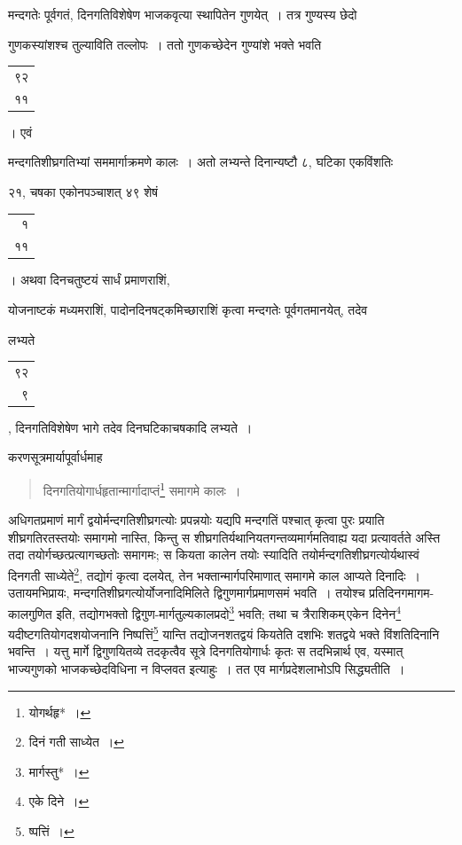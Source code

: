 \documentclass[10pt, openany]{book}
\begin{document}
{{{{{\newpage

{मन्दगतेः पूर्वगतं, दिनगतिविशेषेण भाजकवृत्या स्थापितेन गुणयेत्~। तत्र
गुण्यस्य छेदो}
{गुणकस्यांशश्च तुल्याविति तल्लोपः~। ततो गुणकच्छेदेन गुण्यांशे भक्ते भवति\begin{tabular}{r}९२\\ ११\end{tabular}। एवं}
{मन्दगतिशीघ्रगतिभ्यां सममार्गाक्रमणे कालः~। अतो लभ्यन्ते दिनान्यष्टौ ८,
घटिका एकविंशतिः}
{२१, चषका एकोनपञ्चाशत् ४९ शेषं\begin{tabular}{r}१\\ ११\end{tabular}। अथवा दिनचतुष्टयं सार्धं
प्रमाणराशिं,}
{योजनाष्टकं मध्यमराशिं, पादोनदिनषट्कमिच्छाराशिं कृत्वा मन्दगतेः
पूर्वगतमानयेत्, तदेव}
{लभ्यते\begin{tabular}{r}९२\\ ९\end{tabular}, दिनगतिविशेषेण भागे तदेव दिनघटिकाचषकादि लभ्यते~।}
\vspace{3mm}

{करणसूत्रमार्यापूर्वार्धमाह\textemdash}

\begin{quote}
{\bs दिनगतियोगार्धहृतान्मार्गादाप्तं\renewcommand{\thefootnote}{\s ३}\footnote{\s *योगर्थहृ*~।} समागमे कालः~।} 
\end{quote}

{अधिगतप्रमाणं मार्गं द्वयोर्मन्दगतिशीघ्रगत्योः प्रपन्नयोः यद्यपि
मन्दगतिं पश्चात् कृत्वा}
{पुरः प्रयाति शीघ्रगतिरतस्तयोः समागमो नास्ति, किन्तु स
शीघ्रगतिर्यथानियतगन्तव्यमार्गमतिवाह्य यदा प्रत्यावर्तते अस्ति तदा तयोर्गच्छत्प्रत्यागच्छतोः समागमः;
स कियता कालेन तयोः}
{स्यादिति तयोर्मन्दगतिशीघ्रगत्योर्यथास्वं दिनगती साध्येते\renewcommand{\thefootnote}{\s ४}\footnote{\s दिनं गती
साध्येत~।}, तद्योगं
कृत्वा दलयेत्, तेन भक्तान्मार्गपरिमाणात् समागमे काल आप्यते दिनादिः~। उतायमभिप्रायः,
मन्दगतिशीघ्रगत्योर्योजनादिमिलिते द्विगुणमार्गप्रमाणसमं भवति~। तयोश्च प्रतिदिनगमागम-कालगुणित
इति, तद्योगभक्तो द्विगुण-मार्गतुल्यकालप्रदो\renewcommand{\thefootnote}{\s ५}\footnote{\s *मार्गस्तु*~।} \;भवति; \;तथा \;च \;त्रैराशिकम्\textendash \,एकेन \;दिनेन\renewcommand{\thefootnote}{\s ६}\footnote{\s एके दिने~।} \;यदीष्टगतियोगदशयोजनानि}
{निष्पत्तिं\renewcommand{\thefootnote}{\s ७}\footnote{\s ष्पत्तिं~।} यान्ति तद्योजनशतद्वयं कियतेति दशभिः शतद्वये भक्ते
विंशतिदिनानि भवन्ति~। यत्तु}
{मार्गे द्विगुणयितव्ये तदकृत्वैव सूत्रे दिनगतियोगार्धः कृतः स
तदभिन्नार्थ एव, यस्मात् भाज्यगुणको}
{भाजकच्छेदविधिना न विप्लवत इत्याहुः~। तत एव मार्गप्रदेशलाभोऽपि
सिद्ध्यतीति~।}

}}}}}
\end{document}
